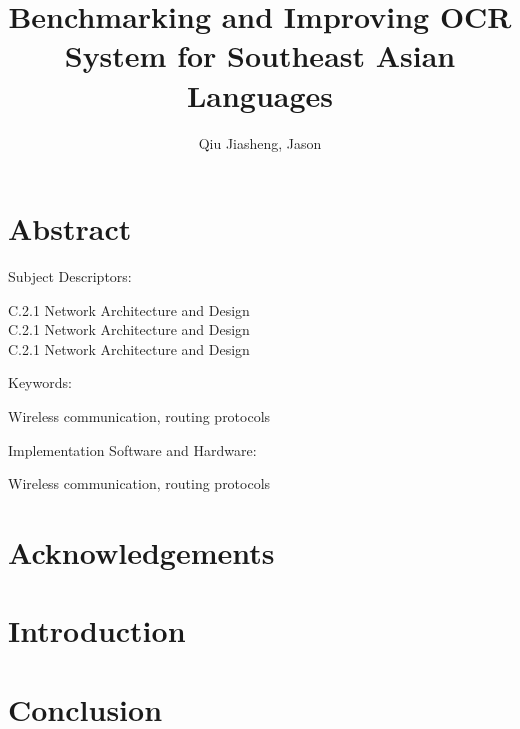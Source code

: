 \documentclass[12pt,oneside]{memoir}
\title{Benchmarking and Improving OCR System for Southeast Asian Languages}
\author{Qiu Jiasheng, Jason}
\begin{document}
\frontmatter

\pagestyle{plain}

\makecover

\setcounter{page}{1}

\maketitle

\chapter{Abstract}
\lipsum[1-2]

Subject Descriptors:
\begin{adjustwidth}{0.7in}{}
    C.2.1 Network Architecture and Design \\
    C.2.1 Network Architecture and Design \\
    C.2.1 Network Architecture and Design
\end{adjustwidth}

Keywords:
\begin{adjustwidth}{0.7in}{}
    Wireless communication, routing protocols
\end{adjustwidth}

Implementation Software and Hardware:
\begin{adjustwidth}{0.7in}{}
    Wireless communication, routing protocols
\end{adjustwidth}

\chapter{Acknowledgements}
\lipsum[1-6]

\tableofcontents

\mainmatter

\chapter{Introduction}

\chapter{Conclusion}
\end{document}
